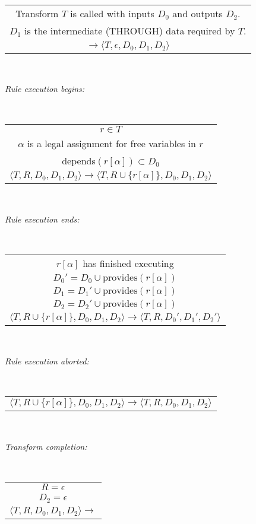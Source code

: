 \documentclass[11pt]{article}
\begin{document}
~

\begin{tabular}{c}
Transform $T$ is called with inputs $D_0$ and outputs $D_2$.
\\
$D_1$ is the intermediate (THROUGH) data required by $T$.
\\\hline
$\rightarrow \langle T, \epsilon, D_0, D_1, D_2 \rangle$ 
\end{tabular}

~

\noindent
{\it
Rule execution begins:}

~

\begin{tabular}{c}
$r \in T$ \\
$\alpha$ is a legal assignment for free variables in $r$ \\
depends$(r[\alpha]) \subset D_0$  
\\\hline
$
\langle T, R, D_0, D_1, D_2 \rangle
\rightarrow
\langle T, R \cup \{r[\alpha]\}, D_0, D_1, D_2 \rangle$ 
\end{tabular}

~

\noindent
{\it
Rule execution ends:}

~

\begin{tabular}{c}
$r[\alpha]$ has finished executing
\\
$D_0' = D_0 \cup {\mbox{provides}(r[\alpha])}$
\\
$D_1 = D_1' \cup {\mbox{provides}(r[\alpha])}$
\\
$D_2 = D_2' \cup {\mbox{provides}(r[\alpha])}$
\\\hline
$
\langle T, R \cup \{r[\alpha]\}, D_0, D_1, D_2 \rangle
\rightarrow
\langle T, R, D_0', D_1', D_2' \rangle$
\end{tabular}

~

\noindent
{\it
Rule execution aborted:}

~

\begin{tabular}{c}
$
\langle T, R \cup \{r[\alpha]\}, D_0, D_1, D_2 \rangle
\rightarrow
\langle T, R, D_0, D_1, D_2 \rangle$
\end{tabular}


~

\noindent
{\it
Transform completion:}

~

\begin{tabular}{c}
$R=\epsilon$
\\
$D_2=\epsilon$
\\\hline
$
\langle T, R, D_0, D_1, D_2 \rangle
\rightarrow$
\end{tabular}
\end{document}
